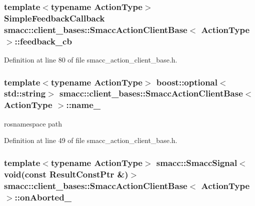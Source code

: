 \subsubsection[{\texorpdfstring{feedback\+\_\+cb}{feedback_cb}}]{\setlength{\rightskip}{0pt plus 5cm}template$<$typename Action\+Type$>$ {\bf Simple\+Feedback\+Callback} {\bf smacc\+::client\+\_\+bases\+::\+Smacc\+Action\+Client\+Base}$<$ Action\+Type $>$\+::feedback\+\_\+cb}\hypertarget{classsmacc_1_1client__bases_1_1SmaccActionClientBase_a978629b407530f1b7d266a009eff664b}{}\label{classsmacc_1_1client__bases_1_1SmaccActionClientBase_a978629b407530f1b7d266a009eff664b}


Definition at line 80 of file smacc\+\_\+action\+\_\+client\+\_\+base.\+h.

\subsubsection[{\texorpdfstring{name\+\_\+}{name_}}]{\setlength{\rightskip}{0pt plus 5cm}template$<$typename Action\+Type$>$ boost\+::optional$<$std\+::string$>$ {\bf smacc\+::client\+\_\+bases\+::\+Smacc\+Action\+Client\+Base}$<$ Action\+Type $>$\+::name\+\_\+}\hypertarget{classsmacc_1_1client__bases_1_1SmaccActionClientBase_a12b007d3c3657b0f0699e97cdb96a490}{}\label{classsmacc_1_1client__bases_1_1SmaccActionClientBase_a12b007d3c3657b0f0699e97cdb96a490}


rosnamespace path 



Definition at line 49 of file smacc\+\_\+action\+\_\+client\+\_\+base.\+h.

\subsubsection[{\texorpdfstring{on\+Aborted\+\_\+}{onAborted_}}]{\setlength{\rightskip}{0pt plus 5cm}template$<$typename Action\+Type$>$ {\bf smacc\+::\+Smacc\+Signal}$<$void(const Result\+Const\+Ptr \&)$>$ {\bf smacc\+::client\+\_\+bases\+::\+Smacc\+Action\+Client\+Base}$<$ Action\+Type $>$\+::on\+Aborted\+\_\+}\hypertarget{classsmacc_1_1client__bases_1_1SmaccActionClientBase_adc33748ca4fcef9730f8039b75d496d0}{}\label{classsmacc_1_1client__bases_1_1SmaccActionClientBase_adc33748ca4fcef9730f8039b75d496d0}


